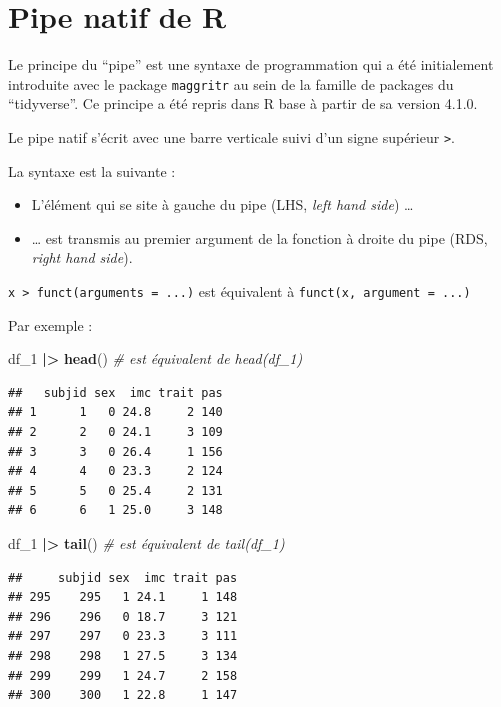 \documentclass[
]{book}
\newenvironment{Shaded}{\begin{snugshade}}{\end{snugshade}}
\newcommand{\CommentTok}[1]{\textcolor[rgb]{0.56,0.35,0.01}{\textit{#1}}}
\newcommand{\FunctionTok}[1]{\textcolor[rgb]{0.13,0.29,0.53}{\textbf{#1}}}
\newcommand{\NormalTok}[1]{#1}
\newcommand{\SpecialCharTok}[1]{\textcolor[rgb]{0.81,0.36,0.00}{\textbf{#1}}}
\providecommand{\tightlist}{%
  \setlength{\itemsep}{0pt}\setlength{\parskip}{0pt}}
\begin{document}
\section{Pipe natif de R}\label{pipe-natif-de-r}

Le principe du ``pipe'' est une syntaxe de programmation qui a été initialement introduite avec le package \texttt{maggritr} au sein de la famille de packages du ``tidyverse''. Ce principe a été repris dans R base à partir de sa version 4.1.0.

Le pipe natif s'écrit avec une barre verticale suivi d'un signe supérieur \texttt{\textbar{}\textgreater{}}.

La syntaxe est la suivante :

\begin{itemize}
\tightlist
\item
  L'élément qui se site à gauche du pipe (LHS, \emph{left hand side}) \ldots{}
\item
  \ldots{} est transmis au premier argument de la fonction à droite du pipe (RDS, \emph{right hand side}).
\end{itemize}

\texttt{x\ \textbar{}\textgreater{}\ funct(arguments\ =\ ...)} est équivalent à \texttt{funct(x,\ argument\ =\ ...)}

Par exemple :

\begin{Shaded}
\begin{Highlighting}[]
\NormalTok{df\_1 }\SpecialCharTok{|\textgreater{}} \FunctionTok{head}\NormalTok{() }\CommentTok{\# est équivalent de head(df\_1)}
\end{Highlighting}
\end{Shaded}

\begin{verbatim}
##   subjid sex  imc trait pas
## 1      1   0 24.8     2 140
## 2      2   0 24.1     3 109
## 3      3   0 26.4     1 156
## 4      4   0 23.3     2 124
## 5      5   0 25.4     2 131
## 6      6   1 25.0     3 148
\end{verbatim}

\begin{Shaded}
\begin{Highlighting}[]
\NormalTok{df\_1 }\SpecialCharTok{|\textgreater{}} \FunctionTok{tail}\NormalTok{()  }\CommentTok{\# est équivalent de tail(df\_1)}
\end{Highlighting}
\end{Shaded}

\begin{verbatim}
##     subjid sex  imc trait pas
## 295    295   1 24.1     1 148
## 296    296   0 18.7     3 121
## 297    297   0 23.3     3 111
## 298    298   1 27.5     3 134
## 299    299   1 24.7     2 158
## 300    300   1 22.8     1 147
\end{verbatim}
\end{document}
